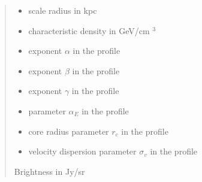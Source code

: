 \documentclass[letterpaper,10pt,english]{sphinxmanual}
\begin{document}
\begin{fulllineitems}
\begin{itemize}
\end{itemize}
\begin{quote}\begin{description}
\begin{itemize}
\item {} 
\sphinxAtStartPar
{} \textendash{} scale radius in kpc

\item {} 
\sphinxAtStartPar
{} \textendash{} characteristic density in GeV/cm \({}^3\)

\item {} 
\sphinxAtStartPar
{} \textendash{} exponent \(\alpha\) in the {\hyperref[\detokenize{diffsph.profiles:diffsph.profiles.templates.hdz}]{}} profile

\item {} 
\sphinxAtStartPar
{} \textendash{} exponent \(\beta\) in the {\hyperref[\detokenize{diffsph.profiles:diffsph.profiles.templates.hdz}]{}} profile

\item {} 
\sphinxAtStartPar
{} \textendash{} exponent \(\gamma\) in the {\hyperref[\detokenize{diffsph.profiles:diffsph.profiles.templates.hdz}]{}} profile

\item {} 
\sphinxAtStartPar
{} \textendash{} parameter \(\alpha_E\) in the {\hyperref[\detokenize{diffsph.profiles:diffsph.profiles.templates.enst}]{}} profile

\item {} 
\sphinxAtStartPar
{} \textendash{} core radius parameter \(r_c\) in the {\hyperref[\detokenize{diffsph.profiles:diffsph.profiles.templates.cnfw}]{}} profile

\item {} 
\sphinxAtStartPar
{} \textendash{} velocity dispersion parameter \(\sigma_v\) in the {\hyperref[\detokenize{diffsph.profiles:diffsph.profiles.templates.sis}]{}} profile

\end{itemize}

\sphinxAtStartPar
Brightness in Jy/sr

\end{description}\end{quote}

\end{fulllineitems}
\end{document}
